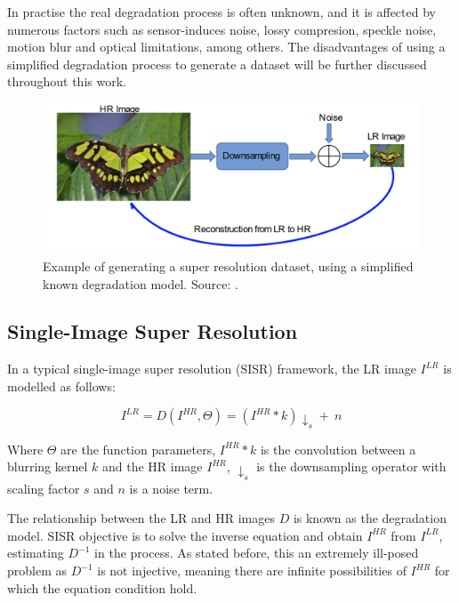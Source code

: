     In practise the real degradation process is often unknown, and it is affected by numerous factors such as sensor-induces noise, lossy compresion, speckle noise, motion blur and optical limitations, among others.
    The disadvantages of using a simplified degradation process to generate a dataset will be further discussed throughout this work.

    \begin{figure}[H]
        \centering
        \includegraphics[width=\textwidth]{Includes/3-super-resolution-data.png}
        \caption{Example of generating a super resolution dataset, using a simplified known degradation model. Source: \cite{bashir2021comprehensive}.}
        \label{fig:3-super-resolution-data}
    \end{figure}

    

    \subsection{Single-Image Super Resolution}

        In a typical single-image super resolution (SISR) framework, the LR image $I^{LR}$ is modelled as follows:
    
        \begin{equation}
            I^{LR} = D(I^{HR},\Theta) = ( I^{HR} \ast k) \downarrow_s + \ n
            \label{eq:2-degradation-equation}
        \end{equation}
    
        Where $\Theta$ are the function parameters, $I^{HR} \ast k$ is the convolution between a blurring kernel $k$ and the  HR image  $I^{HR}$, $\downarrow_s$ is the downsampling operator with scaling factor $s$ and $n$ is a noise term.
        
        The relationship between the LR and HR images $D$ is known as the degradation model.
        SISR objective is to solve the inverse equation and obtain $I^{HR}$ from $I^{LR}$, estimating $D^{-1}$ in the process. As stated before, this an extremely ill-posed problem as $D^{-1}$ is not injective, meaning there are infinite possibilities of $I^{HR}$ for which the equation condition hold. 

